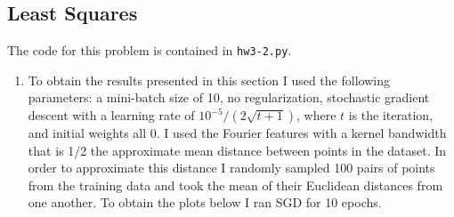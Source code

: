 \documentclass{article}
\begin{document}
\subsection{Least Squares}
The code for this problem is contained in \texttt{hw3-2.py}.
\begin{enumerate}
	\item To obtain the results presented in this section I used the following parameters: a mini-batch size of 10, no regularization, stochastic gradient descent with a learning rate of $10^{-5} / (2\sqrt{t+1})$, where $t$ is the iteration, and initial weights all 0. I used the Fourier features with a kernel bandwidth that is 1/2 the approximate mean distance between points in the dataset. In order to approximate this distance I randomly sampled 100 pairs of points from the training data and took the mean of their Euclidean distances from one another. To obtain the plots below I ran SGD for 10 epochs.



\end{enumerate}
\end{document}
